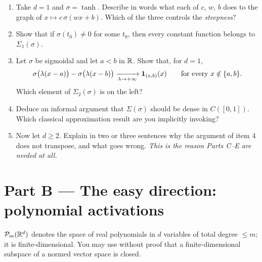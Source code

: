 \documentclass[11pt,a4paper]{article}
\begin{document}
\begin{exercise}\label{ex:warmup}
\leavevmode
\begin{enumerate}[label=\textbf{\arabic*.}]
\item Take $d = 1$ and $\sigma = \tanh$. Describe in words what each of $c$, $w$, $b$ does to the
graph of $x \mapsto c\,\sigma(wx + b)$. Which of the three controls the \emph{steepness}?
\item Show that if $\sigma(t_0) \ne 0$ for some $t_0$, then every constant function belongs to
$\Sigma_1(\sigma)$.
\item Let $\sigma$ be sigmoidal and let $a < b$ in $\mathbb{R}$. Show that, for $d = 1$,
\[
\sigma\big(\lambda(x-a)\big) - \sigma\big(\lambda(x-b)\big) \xrightarrow[\lambda\to+\infty]{}
\mathbf{1}_{(a,b)}(x) \qquad \text{for every } x \notin \{a,b\}.
\]
Which element of $\Sigma_2(\sigma)$ is on the left?
\item Deduce an informal argument that $\Sigma(\sigma)$ should be dense in $C([0,1])$. Which
classical approximation result are you implicitly invoking?
\item Now let $d \ge 2$. Explain in two or three sentences why the argument of item 4 does not
transpose, and what goes wrong. \emph{This is the reason Parts C--E are needed at all.}
\end{enumerate}
\end{exercise}

\section{Part B --- The easy direction: polynomial activations}

\begin{setting}
$\mathcal{P}_m(\mathbb{R}^d)$ denotes the space of real polynomials in $d$ variables of total degree $\le m$; it is
finite-dimensional. You may use without proof that a finite-dimensional subspace of a normed vector
space is closed.
\end{setting}
\end{document}
